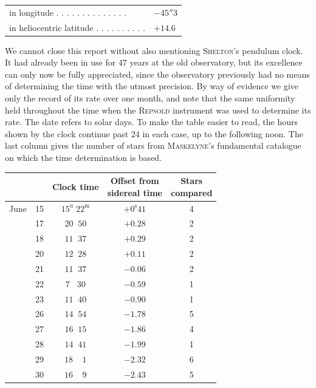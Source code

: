 \begin{center}
\begin{tabular}{ll}
in longitude . . . . . . . . . . . . . . & $-45''3$ \\
in heliocentric latitude . . . . . . . . . . & $+14.6$ \\
\end{tabular}
\end{center}

\par\indent We cannot close this report without also mentioning \textsc{Shelton}’s pendulum clock. It had already been in use for 47 years at the old observatory, but its excellence can only now be fully appreciated, since the observatory previously had no means of determining the time with the utmost precision. By way of evidence we give only the record of its rate over one month, and note that the same uniformity held throughout the time when the \textsc{Repsold} instrument was used to determine its rate. The date refers to solar days. To make the table easier to read, the hours shown by the clock continue past 24 in each case, up to the following noon. The last column gives the number of stars from \textsc{Maskelyne}’s fundamental catalogue on which the time determination is based.

\begin{center}
\begin{tabular}{ll|c|c|c}
 & & Clock time & \shortstack{Offset from\\sidereal time} & \shortstack{Stars\\compared} \\
\hline
June & 15 & $15^{\mathrm u}\;22^{\mathrm m}$ & $+0^{\mathrm s}41$ & 4 \\
 & 17 & $20\;\;50$ & $+0.28$ & 2 \\
 & 18 & $11\;\;37$ & $+0.29$ & 2 \\
 & 20 & $12\;\;28$ & $+0.11$ & 2 \\
 & 21 & $11\;\;37$ & $-0.06$ & 2 \\
 & 22 & $7\;\;\;30$ & $-0.59$ & 1 \\
 & 23 & $11\;\;40$ & $-0.90$ & 1 \\
 & 26 & $14\;\;54$ & $-1.78$ & 5 \\
 & 27 & $16\;\;15$ & $-1.86$ & 4 \\
 & 28 & $14\;\;41$ & $-1.99$ & 1 \\
 & 29 & $18\;\;\;\;1$ & $-2.32$ & 6 \\
 & 30 & $16\;\;\;\;9$ & $-2.43$ & 5 \\
\end{tabular}
\end{center}

